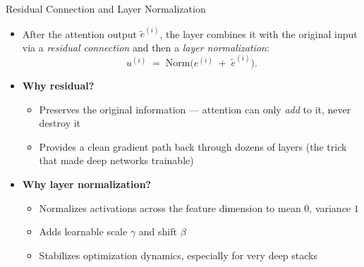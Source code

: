 \begin{frame}{Residual Connection and Layer Normalization}
\begin{itemize}
\item After the attention output $\tilde{e}^{(i)}$, the layer combines it with the original input via a \emph{residual connection} and then a \emph{layer normalization}:
\[
   u^{(i)} \;=\; \mathrm{Norm}\bigl(e^{(i)} \;+\; \tilde{e}^{(i)}\bigr).
\]

\medskip
\item \textbf{Why residual?}
\begin{itemize}
    \item Preserves the original information --- attention can only \emph{add} to it, never destroy it
    \item Provides a clean gradient path back through dozens of layers (the trick that made deep networks trainable)
\end{itemize}

\medskip
\item \textbf{Why layer normalization?}
\begin{itemize}
    \item Normalizes activations across the feature dimension to mean $0$, variance $1$
    \item Adds learnable scale $\gamma$ and shift $\beta$
    \item Stabilizes optimization dynamics, especially for very deep stacks
\end{itemize}
\end{itemize}
\end{frame}

